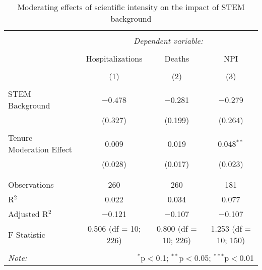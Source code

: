 
\begin{table}[!htbp] \centering 
  \caption{Moderating effects of scientific intensity on the impact of STEM background} 
  \label{} 
\begin{tabular}{@{\extracolsep{5pt}}lccc} 
\\[-1.8ex]\hline 
\hline \\[-1.8ex] 
 & \multicolumn{3}{c}{\textit{Dependent variable:}} \\ 
\cline{2-4} 
\\[-1.8ex] & Hospitalizations & Deaths & NPI \\ 
\\[-1.8ex] & (1) & (2) & (3)\\ 
\hline \\[-1.8ex] 
 STEM Background & $-$0.478 & $-$0.281 & $-$0.279 \\ 
  & (0.327) & (0.199) & (0.264) \\ 
  & & & \\ 
 Tenure Moderation Effect & 0.009 & 0.019 & 0.048$^{**}$ \\ 
  & (0.028) & (0.017) & (0.023) \\ 
  & & & \\ 
\hline \\[-1.8ex] 
Observations & 260 & 260 & 181 \\ 
R$^{2}$ & 0.022 & 0.034 & 0.077 \\ 
Adjusted R$^{2}$ & $-$0.121 & $-$0.107 & $-$0.107 \\ 
F Statistic & 0.506 (df = 10; 226) & 0.800 (df = 10; 226) & 1.253 (df = 10; 150) \\ 
\hline 
\hline \\[-1.8ex] 
\textit{Note:}  & \multicolumn{3}{r}{$^{*}$p$<$0.1; $^{**}$p$<$0.05; $^{***}$p$<$0.01} \\ 
\end{tabular} 
\end{table} 

